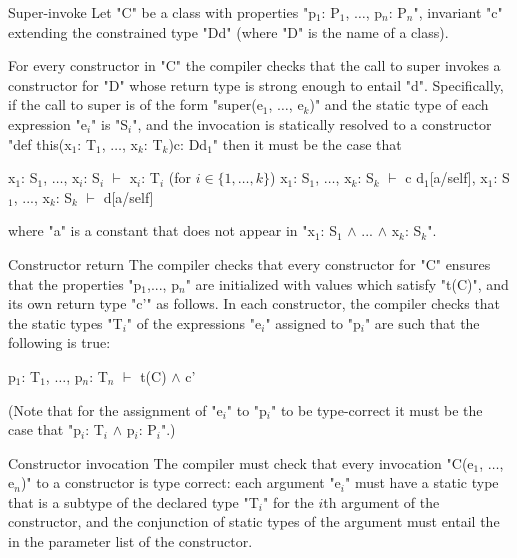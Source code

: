 \begin{staticrule}{Super-invoke}
   Let \xcd"C" be a class with properties
   \xcdmath"p$_1$: P$_1$, $\dots$, p$_n$: P$_n$", invariant \xcd"c"
   extending the constrained type \xcd"D{d}" (where \xcd"D" is the name of a class).

   For every constructor in \xcd"C" the compiler checks that the call to
   super invokes a constructor for \xcd"D" whose return type is strong enough
   to entail \xcd"d". Specifically, if the call to super is of the form 
     \xcdmath"super(e$_1$, $\dots$, e$_k$)"
   and the static type of each expression \xcdmath"e$_i$" is
   \xcdmath"S$_i$", and the invocation
   is statically resolved to a constructor
\xcdmath"def this(x$_1$: T$_1$, $\dots$, x$_k$: T$_k$){c}: D{d$_1$}"
   then it must be the case that 
\begin{xtenmath}
x$_1$: S$_1$, $\dots$, x$_i$: S$_i$ $\vdash$ x$_i$: T$_i$  (for $i \in \{1, \dots, k\}$)
x$_1$: S$_1$, $\dots$, x$_k$: S$_k$ $\vdash$ c  
d$_1$[a/self], x$_1$: S$_1$, ..., x$_k$: S$_k$ $\vdash$ d[a/self]      
\end{xtenmath}
\noindent where \xcd"a" is a constant that does not appear in 
\xcdmath"x$_1$: S$_1$ $\wedge$ ... $\wedge$ x$_k$: S$_k$".
\end{staticrule}

\begin{staticrule}{Constructor return}
   The compiler checks that every constructor for \xcd"C" ensures that
   the properties \xcdmath"p$_1$,..., p$_n$" are initialized with values which satisfy
   \xcdmath"t(C)", and its own return type \xcd"c'" as follows.  In each constructor, the
   compiler checks that the static types \xcdmath"T$_i$" of the expressions \xcdmath"e$_i$"
   assigned to \xcdmath"p$_i$" are such that the following is
   true:
\begin{xtenmath}
p$_1$: T$_1$, $\dots$, p$_n$: T$_n$ $\vdash$ t(C) $\wedge$ c'     
\end{xtenmath}
\end{staticrule}
(Note that for the assignment of \xcdmath"e$_i$" to \xcdmath"p$_i$"
to be type-correct it must be the
    case that \xcdmath"p$_i$: T$_i$ $\wedge$ p$_i$: P$_i$".) 


\begin{staticrule}{Constructor invocation}
The compiler must check that every invocation \xcdmath"C(e$_1$, $\dots$, e$_n$)" to a
constructor is type correct: each argument \xcdmath"e$_i$" must have a static type
that is a subtype of the declared type \xcdmath"T$_i$" for the $i$th
argument of the
constructor, and the conjunction of static types of the argument must
entail the  in the parameter list of the constructor.
\end{staticrule}
